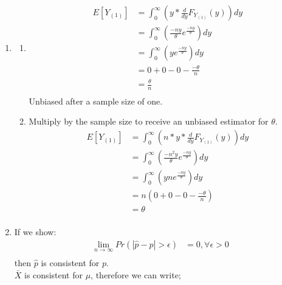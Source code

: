 \documentclass{article}
\begin{document}

\begin{enumerate}

\item 
	\begin{enumerate}
	\item
		\begin{equation*}
		\begin{split}
		E[Y_{(1)}] & = \int_{0}^{\infty} (y*\frac{d}{dy}F_{Y_{(1)}}(y))dy \\
		& = \int_{0}^{\infty} (\frac{-ny}{\theta} e^{\frac{-ny}{\theta}})dy \\
		& = \int_{0}^{\infty} (y e^{\frac{-ny}{\theta}})dy \\
		& = 0+0 - 0 -\frac{-\theta}{n}\\
		& = \frac{\theta}{n}\\
		\end{split}
		\end{equation*}
		Unbiased after a sample size of one.
	\item
		Multiply by the sample size to receive an unbiased estimator for $\theta$.
		\begin{equation*}
		\begin{split}
		E[Y_{(1)}] & = \int_{0}^{\infty} (n*y*\frac{d}{dy}F_{Y_{(1)}}(y))dy \\
		& = \int_{0}^{\infty} (\frac{-n^{2}y}{\theta} e^{\frac{-ny}{\theta}})dy \\
		& = \int_{0}^{\infty} (yn e^{\frac{-ny}{\theta}})dy \\
		& =n( 0+0 - 0 -\frac{-\theta}{n})\\
		& = \theta \\
		\end{split}
		\end{equation*}
	\end{enumerate}
\item
	If we show:
	\begin{equation*}
	\begin{split}
	\lim_{n\rightarrow \infty} Pr(\left| \hat{p} - p \right| > \epsilon) &= 0, \forall \epsilon > 0 \\
	\end{split}
	\end{equation*}
	then $\hat{p}$ is consistent for $p$.	\\
	$\bar{X}$ is consistent for $\mu$, therefore we can write;
	\begin{equation*}

\end{equation*}
\end{enumerate}
\end{document}
